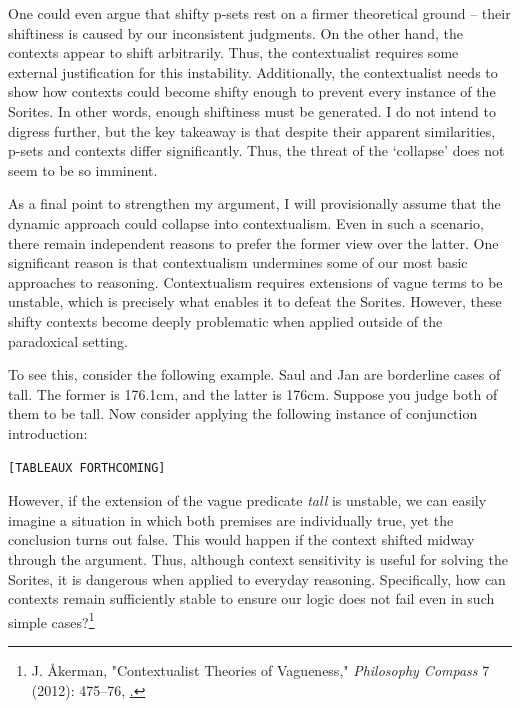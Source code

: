 One could even argue that shifty p-sets rest on a firmer theoretical
ground -- their shiftiness is caused by our inconsistent judgments. On
the other hand, the contexts appear to shift arbitrarily. Thus, the
contextualist requires some external justification for this instability.
Additionally, the contextualist needs to show how contexts could become
shifty enough to prevent every instance of the Sorites. In other words,
enough shiftiness must be generated. I do not intend to digress further,
but the key takeaway is that despite their apparent similarities, p-sets
and contexts differ significantly. Thus, the threat of the `collapse'
does not seem to be so imminent.

As a final point to strengthen my argument, I will provisionally assume
that the dynamic approach could collapse into contextualism. Even in
such a scenario, there remain independent reasons to prefer the former
view over the latter. One significant reason is that contextualism
undermines some of our most basic approaches to reasoning. Contextualism
requires extensions of vague terms to be unstable, which is precisely
what enables it to defeat the Sorites. However, these shifty contexts
become deeply problematic when applied outside of the paradoxical
setting.

To see this, consider the following example. Saul and Jan are borderline
cases of tall. The former is 176.1cm, and the latter is 176cm. Suppose
you judge both of them to be tall. Now consider applying the following
instance of conjunction introduction:




\begin{center}
  \texttt{[TABLEAUX FORTHCOMING]}
\end{center}
However, if the extension of the vague predicate \emph{tall} is
unstable, we can easily imagine a situation in which both premises are
individually true, yet the conclusion turns out false. This would happen
if the context shifted midway through the argument. Thus, although
context sensitivity is useful for solving the Sorites, it is dangerous
when applied to everyday reasoning. Specifically, how can contexts
remain sufficiently stable to ensure our logic does not fail even in
such simple cases?\footnote{J. Åkerman, "Contextualist Theories of
  Vagueness," \emph{Philosophy Compass} 7 (2012): 475--76,
  \href{https://doi.org/10.1111/j.1747-9991.2012.00495.x}.}

